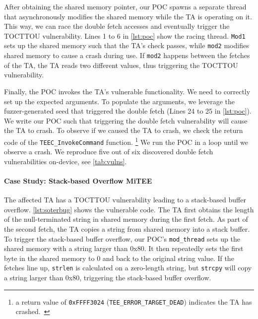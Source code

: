 \documentclass[letterpaper,twocolumn,10pt]{article}
\newcommand{\mitee}{MiTEE\xspace}
\newcommand{\numvulns}{six\xspace}
\newcommand{\numvulnsrepro}{five\xspace}
\begin{document}
After obtaining the shared memory pointer, 
our POC spawns a separate thread that asynchronously modifies the shared 
memory while the TA is operating on it. This way, we can race the 
double fetch accesses and eventually trigger the TOCTTOU vulnerability. 
Lines 1 to 6 in \autoref{lst:poc} show the racing thread. \texttt{Mod1} sets up the shared memory such that the TA's 
check passes, while \texttt{mod2} modifies shared memory to cause a crash during use.
If \texttt{mod2} happens between 
the fetches of the TA, the TA reads two different values, thus triggering 
the TOCTTOU vulnerability.

Finally, the POC invokes the TA's vulnerable functionality. We need to correctly 
set up the expected arguments. To populate the arguments, we leverage the fuzzer-generated 
seed that triggered the double fetch (Lines 24 to 25 in \autoref{lst:poc}).
We write our POC such that triggering the double fetch vulnerability will 
cause the TA to crash. To observe if we caused the TA to crash, we check the 
return code of the \texttt{TEEC\_InvokeCommand} function. \footnote{a return value of \texttt{0xFFFF3024} (\texttt{TEE\_ERROR\_TARGET\_DEAD}) indicates the TA has crashed.~\cite{gpintapi}}
We run the POC in a loop until we observe a crash. 
We reproduce \numvulnsrepro{} out of \numvulns{} discovered 
double fetch vulnerabilities on-device, see \autoref{tab:vulns}.

\paragraph{Case Study: Stack-based Overflow \mitee}

\begin{listing}[h]
    
    \label{lst:soterbug}
\end{listing}

The affected TA has a TOCTTOU vulnerability 
leading to a stack-based buffer overflow. \autoref{lst:soterbug} shows the vulnerable code. 
The TA first obtains the length of the null-terminated string in shared memory during the first 
fetch. As part of the second fetch, the TA copies a string from shared memory into a stack buffer. 
To trigger the stack-based buffer overflow, our POC's \texttt{mod\_thread} sets up the shared 
memory with a string larger than 0x80. It then repeatedly sets the 
first byte in the shared memory to 0 and back to the original string value. If the fetches 
line up, \texttt{strlen} is calculated on a zero-length string, but \texttt{strcpy} will 
copy a string larger than 0x80, triggering the stack-based buffer overflow.
\end{document}
